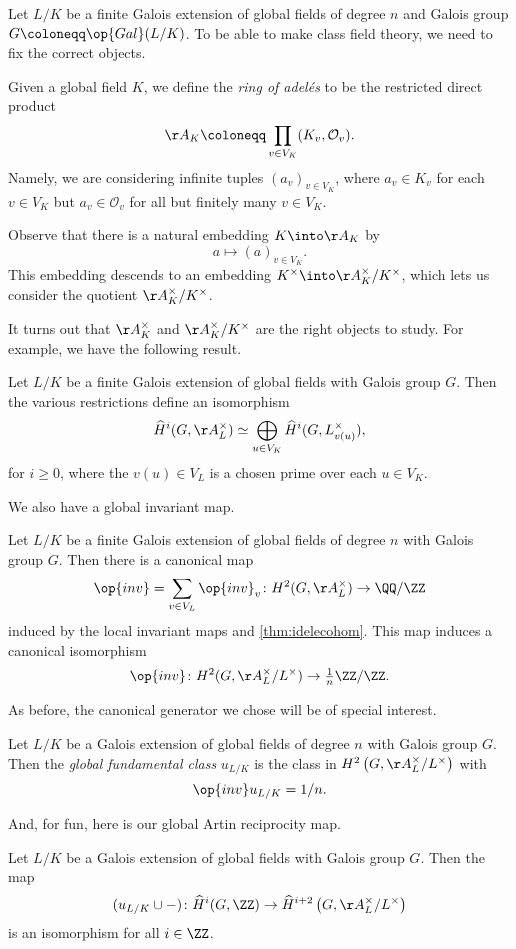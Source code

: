 Let $L/K$ be a finite Galois extension of global fields of degree $n$ and Galois group $G\coloneqq\op{Gal}(L/K)$. To be able to make class field theory, we need to fix the correct objects.
\begin{definition}
	Given a global field $K$, we define the \textit{ring of adel\'es} to be the restricted direct product
	\[\AA_K\coloneqq\prod_{v\in V_K}(K_v,\mathcal O_v).\]
	Namely, we are considering infinite tuples $(a_v)_{v\in V_K}$, where $a_v\in K_v$ for each $v\in V_K$ but $a_v\in\mathcal O_v$ for all but finitely many $v\in V_K$.
\end{definition}
Observe that there is a natural embedding $K\into\AA_K$ by
\[a\mapsto(a)_{v\in V_K}.\]
This embedding descends to an embedding $K^\times\into\AA_K^\times/K^\times$, which lets us consider the quotient $\AA_K^\times/K^\times$.

It turns out that $\AA_K^\times$ and $\AA_K^\times/K^\times$ are the right objects to study. For example, we have the following result.
\begin{theorem} \label{thm:idelecohom}
	Let $L/K$ be a finite Galois extension of global fields with Galois group $G$. Then the various restrictions define an isomorphism
	\[\widehat H^i(G,\AA_L^\times)\simeq\bigoplus_{u\in V_K}\widehat H^i(G,L_{v(u)}^\times),\]
	for $i\ge0$, where the $v(u)\in V_L$ is a chosen prime over each $u\in V_K$.
\end{theorem}
We also have a global invariant map.
\begin{theorem}
	Let $L/K$ be a finite Galois extension of global fields of degree $n$ with Galois group $G$. Then there is a canonical map
	\[\op{inv}=\sum_{v\in V_L}\op{inv}_v\colon H^2(G,\AA_L^\times)\to\QQ/\ZZ\]
	induced by the local invariant maps and \autoref{thm:idelecohom}. This map induces a canonical isomorphism
	\[\op{inv}\colon H^2(G,\AA_L^\times/L^\times)\to{\textstyle\frac1n}\ZZ/\ZZ.\]
\end{theorem}
As before, the canonical generator we chose will be of special interest.
\begin{definition}
	Let $L/K$ be a Galois extension of global fields of degree $n$ with Galois group $G$. Then the \textit{global fundamental class} $u_{L/K}$ is the class in $H^2\left(G,\AA_L^\times/L^\times\right)$ with
	\[\op{inv}u_{L/K}=1/n.\]
\end{definition}
And, for fun, here is our global Artin reciprocity map.
\begin{theorem}
	Let $L/K$ be a Galois extension of global fields with Galois group $G$. Then the map
	\[(u_{L/K}\cup-)\colon\widehat H^i(G,\ZZ)\to\widehat H^{i+2}\left(G,\AA_L^\times/L^\times\right)\]
	is an isomorphism for all $i\in\ZZ$.
\end{theorem}

